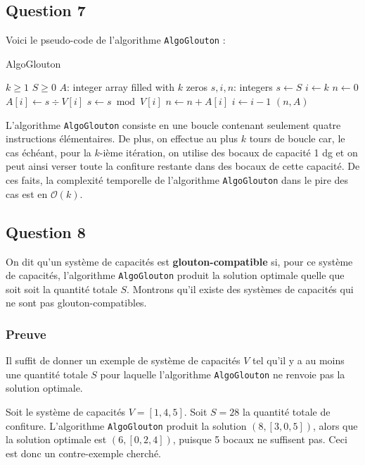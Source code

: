 \documentclass[12pt,a4paper]{article}
\newcommand{\BigO}{\mathcal{O}}
\begin{document}
\subsection*{Question 7}
Voici le pseudo-code de l'algorithme \texttt{AlgoGlouton} :
\begin{algorithm}
\caption{AlgoGlouton}
\begin{algorithmic}[1]
\Require $k \geq 1$ \AND $S \geq 0$
	\State $A$: integer array filled with $k$ zeros
    \State $s, i, n$: integers
    \State $s \gets S$
    \State $i \gets k$
    \State $n \gets 0$
    	\State $A[i] \gets s \div V[i] $
        \State $s \gets s \bmod V[i] $
        \State $n \gets n+A[i]$
        \State $i \gets i-1$
    \EndWhile
    \State \Return $(n, A)$
\EndFunction
\end{algorithmic}
\end{algorithm}

L'algorithme \texttt{AlgoGlouton} consiste en une boucle contenant seulement quatre instructions \'el\'ementaires. De plus, on effectue au plus $k$ tours de boucle car, le cas \'ech\'eant, pour la $k$-i\`eme it\'eration, on utilise des bocaux de capacit\'e 1 \si{dg} et on peut ainsi verser toute la confiture restante dans des bocaux de cette capacit\'e. De ces faits, la complexit\'e temporelle de l'algorithme \texttt{AlgoGlouton} dans le pire des cas est en $\BigO(k)$.

\subsection*{Question 8}
 On dit qu'un syst\`eme de capacit\'es est {\bfseries glouton-compatible} si, pour ce syst\`eme de capacit\'es, l'algorithme \texttt{AlgoGlouton} produit la solution optimale quelle que soit soit la quantit\'e totale $S$.
 Montrons qu'il existe des syst\`emes de capacit\'es qui ne sont pas glouton-compatibles.
 
 \subsubsection*{Preuve}
 Il suffit de donner un exemple de syst\`eme de capacit\'es $V$ tel qu'il y a au moins une quantit\'e totale $S$ pour laquelle l'algorithme \texttt{AlgoGlouton} ne renvoie pas la solution optimale.
 
 Soit le syst\`eme de capacit\'es $V = [1, 4, 5]$. Soit $S = 28$ la quantit\'e totale de confiture. L'algorithme \texttt{AlgoGlouton} produit la solution $(8, [3, 0, 5])$, alors que la solution optimale est $(6, [0, 2, 4])$, puisque 5 bocaux ne suffisent pas. Ceci est donc un contre-exemple cherch\'e.
\end{document}
